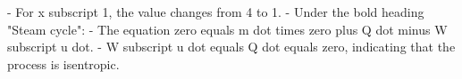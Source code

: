 - For x subscript 1, the value changes from 4 to 1.
- Under the bold heading "Steam cycle":
  - The equation zero equals m dot times zero plus Q dot minus W subscript u dot.
  - W subscript u dot equals Q dot equals zero, indicating that the process is isentropic.